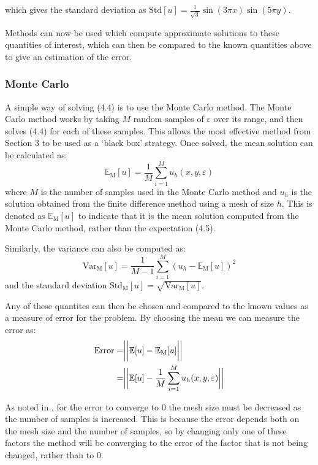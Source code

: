 \documentclass{article}
\numberwithin{equation}{section}
\begin{document}
which gives the standard deviation as $\text{Std}[u] = \frac{1}{\sqrt{3}} \sin(3 \pi x) \sin(5 \pi y)$.

Methods can now be used which compute approximate solutions to these quantities of interest, which can then be compared to the known quantities above to give an estimation of the error.

\subsubsection{Monte Carlo}
A simple way of solving (4.4) is to use the Monte Carlo method. The Monte Carlo method works by taking $M$ random samples of $\varepsilon$ over its range, and then solves (4.4) for each of these samples. 
This allows the most effective method from Section 3 to be used as a `black box' strategy. Once solved, the mean solution can be calculated as:
\begin{equation}
\mathbb{E}_\text{M}[u] = \frac{1}{M} \sum_{i=1}^M u_h (x, y, \varepsilon)
\end{equation}
where $M$ is the number of samples used in the Monte Carlo method and $u_h$ is the solution obtained from the finite difference method using a mesh of size $h$. This is denoted as $\mathbb{E}_\text{M}[u]$ to indicate that it is the mean solution computed from the Monte Carlo method, rather than the expectation (4.5). 

Similarly, the variance can also be computed as:
\begin{equation}
\text{Var}_\text{M}[u] = \frac{1}{M-1}\sum_{i=1}^M (u_h - \mathbb{E}_\text{M}[u])^2
\end{equation}
and the standard deviation $\text{Std}_\text{M}[u] = \sqrt{\text{Var}_\text{M}[u]}$.


Any of these quantites can then be chosen and compared to the known values as a measure of error for the problem. By choosing the mean we can measure the error as:
\begin{equation}
\begin{split}
\text{Error} = & \bigg{|} \bigg{|} \mathbb{E}[u] - \mathbb{E}_\text{M}[u] \bigg{|} \bigg{|} \\
= & \bigg{|} \bigg{|} \mathbb{E}[u] - \frac{1}{M} \sum_{i=1}^M u_h (x, y, \varepsilon) \bigg{|}\bigg{|}
\end{split}
\end{equation}

As noted in \cite{Bishop}, for the error to converge to 0 the mesh size must be decreased as the number of samples is increased. This is because the error depends both on the mesh size and the number of samples, so by changing only one of these factors the method will be converging to the error of the factor that is not being changed, rather than to 0. 
\end{document}
